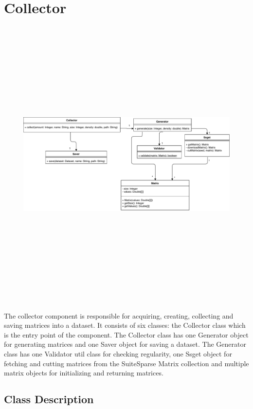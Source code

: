 \documentclass[parskip=full]{scrartcl}
\begin{document}
\section{Collector}
\begin{figure}[h]
\begin{center}
\includegraphics[width=17cm,height=15cm,keepaspectratio]{ClassDiagrams/PDF/Collector_classdiagram.pdf}
%
\label{Activity Diagrams}
\end{center}
\end{figure}

The collector component is responsible for acquiring, creating, collecting and saving matrices into a dataset. It consists of six classes:
the Collector class which is the entry point of the component. The Collector class has one Generator object for generating matrices and one Saver object for saving a dataset. The Generator class has one Validator util class for checking regularity, one Ssget object for fetching and cutting matrices from the SuiteSparse Matrix collection and multiple matrix objects for initializing and returning matrices.

\subsection{Class Description}
\end{document}
